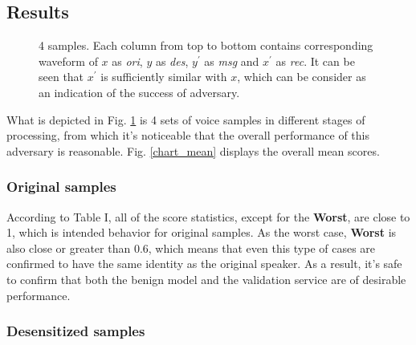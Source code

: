 \documentclass[conference]{IEEEtran}
\begin{document}
\subsection{Results}

\begin{figure}[tb]
    \caption{4 samples. Each column from top to bottom contains corresponding waveform of $x$ as \textit{ori}, $y$ as \textit{des}, $y^{\prime}$ as \textit{msg} and $x^{\prime}$ as \textit{rec}. It can be seen that $x^{\prime}$ is sufficiently similar with $x$, which can be consider as an indication of the success of adversary.}
    \label{samp1}
\end{figure}

What is depicted in Fig. \ref{samp1} is 4 sets of voice samples in different stages of processing, from which it's noticeable that the overall performance of this adversary is reasonable. Fig. \ref{chart_mean} displays the overall mean scores.

\subsubsection{Original samples}

According to Table I, all of the score statistics, except for the \textbf{Worst}, are close to 1, which is intended behavior for original samples. As the worst case, \textbf{Worst} is also close or greater than 0.6, which means that even this type of cases are confirmed to have the same identity as the original speaker. As a result, it's safe to confirm that both the benign model and the validation service are of desirable performance.

\subsubsection{Desensitized samples}
\end{document}
